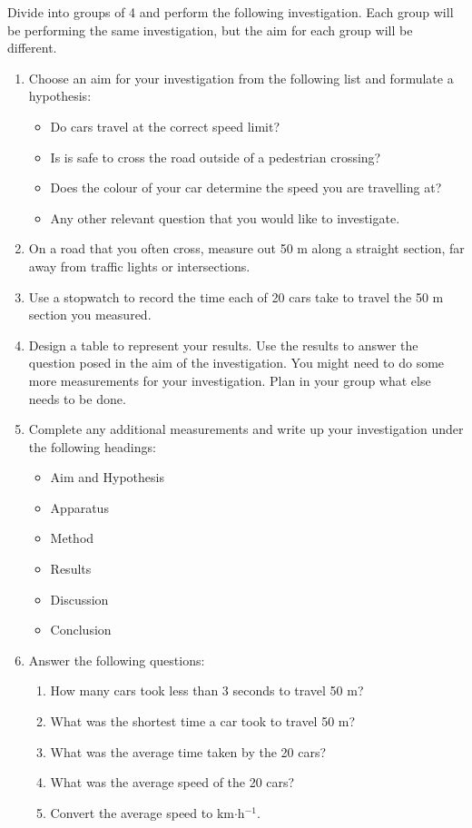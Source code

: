 {Divide into groups of 4 and perform the following investigation. Each group will be performing the same investigation, but the aim for each group will be different.
\begin{enumerate}
\item Choose an aim for your investigation from the following list and formulate a hypothesis: \begin{itemize}
\item Do cars travel at the correct speed limit?
\item Is is safe to cross the road outside of a pedestrian crossing?
\item Does the colour of your car determine the speed you are travelling at?
\item Any other relevant question that you would like to investigate.
\end{itemize}
\item On a road that you often cross, measure out 50 m along a straight section, far away from traffic lights or intersections.
\item Use a stopwatch to record the time each of 20 cars take to travel the 50 m section you measured.
\item Design a table to represent your results. Use the results to answer the question posed in the aim of the investigation. You might need to do some more measurements for your investigation. Plan in your group what else needs to be done.
\item Complete any additional measurements and write up your investigation under the following headings:\begin{itemize}
\item Aim and Hypothesis
\item Apparatus
\item Method
\item Results
\item Discussion
\item Conclusion
\end{itemize}
\item Answer the following questions:\begin{enumerate}
\item How many cars took less than 3 seconds to travel 50 m?
\item What was the shortest time a car took to travel 50 m?
\item What was the average time taken by the 20 cars?
\item What was the average speed of the 20 cars?
\item Convert the average speed to km$\cdot$h$^{-1}$.
\end{enumerate}
\end{enumerate}}


